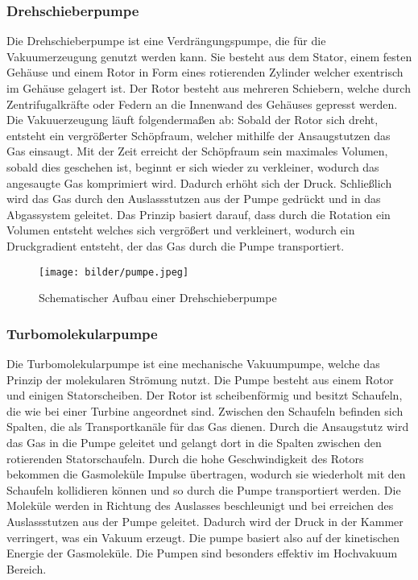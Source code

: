 \subsubsection{Drehschieberpumpe}


Die Drehschieberpumpe ist eine Verdrängungspumpe, die für die Vakuumerzeugung genutzt werden kann.
Sie besteht aus dem Stator, einem festen Gehäuse und einem Rotor in Form eines rotierenden
Zylinder welcher exentrisch im Gehäuse gelagert ist. Der Rotor besteht aus mehreren Schiebern, welche durch Zentrifugalkräfte 
oder Federn an die Innenwand des Gehäuses gepresst werden. Die Vakuuerzeugung läuft folgendermaßen ab:
Sobald der Rotor sich dreht, entsteht ein vergrößerter Schöpfraum, welcher mithilfe der Ansaugstutzen das Gas
einsaugt. Mit der Zeit erreicht der Schöpfraum sein maximales Volumen, sobald dies geschehen ist, beginnt er sich wieder zu 
verkleiner, wodurch das angesaugte Gas komprimiert wird. Dadurch erhöht sich der Druck. Schließlich wird das Gas durch den Auslassstutzen 
aus der Pumpe gedrückt und in das Abgassystem geleitet. Das Prinzip basiert darauf, dass durch die Rotation ein Volumen entsteht welches sich vergrößert 
und verkleinert, wodurch ein Druckgradient entsteht, der das Gas durch die Pumpe transportiert.

\begin{figure}
    \texttt{[image: bilder/pumpe.jpeg]}
    \caption{Schematischer Aufbau einer Drehschieberpumpe}
\end{figure}


\subsubsection{Turbomolekularpumpe}

Die Turbomolekularpumpe ist eine mechanische Vakuumpumpe, welche das Prinzip der molekularen Strömung nutzt.
Die Pumpe besteht aus einem Rotor und einigen Statorscheiben. Der Rotor ist scheibenförmig und besitzt Schaufeln, die wie bei einer Turbine angeordnet sind.
Zwischen den Schaufeln befinden sich Spalten, die als Transportkanäle für das Gas dienen.
Durch die Ansaugstutz wird das Gas in die Pumpe geleitet und gelangt dort in die Spalten zwischen den rotierenden Statorschaufeln. Durch die
hohe Geschwindigkeit des Rotors bekommen die Gasmoleküle Impulse übertragen, wodurch sie wiederholt mit den Schaufeln kollidieren können und so durch
die Pumpe transportiert werden. Die Moleküle werden in Richtung des Auslasses beschleunigt und bei erreichen des Auslassstutzen aus der Pumpe geleitet.
Dadurch wird der Druck in der Kammer verringert, was ein Vakuum erzeugt.
Die pumpe basiert also auf der kinetischen Energie der Gasmoleküle. Die Pumpen sind besonders effektiv im Hochvakuum Bereich.


